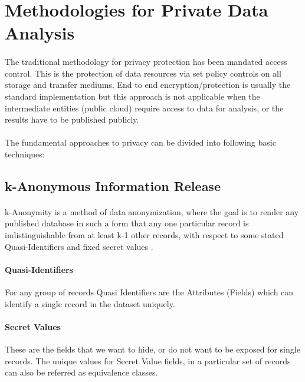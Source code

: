 \documentclass[12pt]{report}
\theoremstyle{named}
\begin{document}
\section{Methodologies for Private Data Analysis}
\paragraph{}
The traditional methodology for privacy protection has been mandated access control. This is the protection of data resources via set policy controls on all storage and transfer mediums. End to end encryption/protection is usually the standard implementation but this approach is not applicable when the intermediate entities (public cloud) require access to data for analysis, or the results have to be published publicly.
\paragraph{}
The fundamental approaches to privacy can be divided into following basic techniques:


\subsection{k-Anonymous Information Release}
\paragraph{}
\label{sec:KAnonmyty}
k-Anonymity \cite{sweeney2002k} is a method of data anonymization, where the goal is to render any published database in such a form that any one particular record is indistinguishable from at least k-1 other records, with respect to some stated Quasi-Identifiers and fixed secret values \cite{dalenius1986finding}.

\paragraph{Quasi-Identifiers}
For any group of records Quasi Identifiers are the Attributes (Fields) which can identify a single record in the dataset uniquely.
\paragraph{Secret Values}
These are the fields that we want to hide, or do not want to be exposed for single records. The unique values for Secret Value fields, in a particular set of records can also be referred as equivalence classes.
\end{document}
